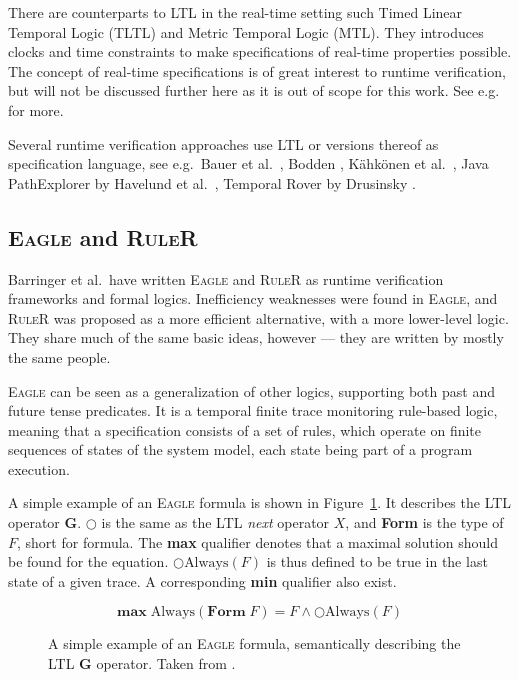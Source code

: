 There are counterparts to LTL in the real-time setting such Timed Linear
Temporal Logic (TLTL) and Metric Temporal Logic (MTL). They introduces clocks
and time constraints to make specifications of real-time properties possible.
The concept of real-time specifications is of great interest to runtime
verification, but will not be discussed further here as it is out of scope for
this work. See e.g.\ \cite{bauer06monitoring,drusinsky00temporalrover} for
more.

Several runtime verification approaches use LTL or versions thereof as
specification language, see e.g.\ Bauer et al.\
\cite{bauer06monitoring}, Bodden \cite{bodden05efficientrv}, Kähkönen et al.\
\cite{kahkonen09lime}, Java PathExplorer by Havelund et al.\
\cite{havelund04jpax}, Temporal Rover by Drusinsky
\cite{drusinsky00temporalrover}.

\subsection{\textsc{Eagle} and \textsc{RuleR}}

Barringer et al.\ have written \textsc{Eagle} \cite{barringer03eagle} and
\textsc{RuleR} \cite{barringer07ruler} as runtime verification frameworks and
formal logics.  Inefficiency weaknesses were found in \textsc{Eagle}, and
\textsc{RuleR} was proposed as a more efficient alternative, with a more
lower-level logic. They share much of the same basic ideas, however --- they
are written by mostly the same people.

\textsc{Eagle} can be seen as a generalization of other logics, supporting both
past and future tense predicates. It is a temporal finite trace monitoring
rule-based logic, meaning that a specification consists of a set of rules,
which operate on finite sequences of states of the system model, each state
being part of a program execution.

A simple example of an \textsc{Eagle} formula is shown in
Figure~\ref{figure-eagle-always}.
It describes the LTL operator $\boldsymbol{G}$. $\bigcirc$ is the same as the
LTL \textit{next} operator $X$, and \textbf{Form} is the type of $F$, short for
formula. The \textbf{max} qualifier denotes that a maximal solution should be
found for the equation. $\bigcirc \text{Always}(F)$ is thus defined to be true
in the last state of a given trace. A corresponding \textbf{min} qualifier also
exist.

\begin{figure}[h!]
	\[
  \textbf{max} \; \text{Always}(\textbf{Form} \; F) = F \wedge \bigcirc \text{Always}(F)
	\]

  \caption{A simple example of an \textsc{Eagle} formula, semantically
    describing the LTL $\boldsymbol{G}$ operator. Taken from
    \cite{barringer03eagle}.}
	\label{figure-eagle-always}
\end{figure}


